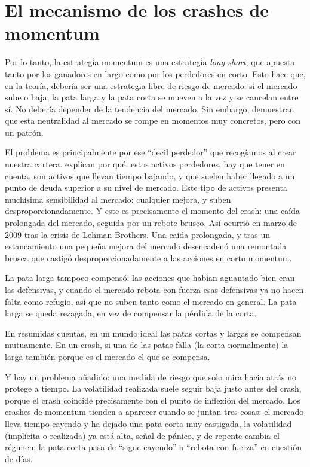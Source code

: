 \documentclass[12pt]{report} %
\begin{document}
\section{El mecanismo de los crashes de momentum}

Por lo tanto, la estrategia momentum es una estrategia \textit{long-short}, que apuesta tanto por los ganadores en largo como por los perdedores en corto. Esto hace que, en la teoría, debería ser una estrategia libre de riesgo de mercado: si el mercado sube o baja, la pata larga y la pata corta se mueven a la vez y se cancelan entre sí. No debería depender de la tendencia del mercado. Sin embargo, \citet{danielmoskowitz2016} demuestran que esta neutralidad al mercado se rompe en momentos muy concretos, pero con un patrón.

El problema es principalmente por ese ``decil perdedor'' que recogíamos al crear nuestra cartera. \citet{danielmoskowitz2016} explican por qué: estos activos perdedores, hay que tener en cuenta, son activos que llevan tiempo bajando, y que suelen haber llegado a un punto de deuda superior a su nivel de mercado. Este tipo de activos presenta muchísima sensibilidad al mercado: cualquier mejora, y suben desproporcionadamente. Y este es precisamente el momento del crash: una caída prolongada del mercado, seguida por un rebote brusco. Así ocurrió en marzo de 2009 tras la crisis de Lehman Brothers. Una caída prolongada, y tras un estancamiento una pequeña mejora del mercado desencadenó una remontada brusca que castigó desproporcionadamente a las acciones en corto momentum.

La pata larga tampoco compensó: las acciones que habían aguantado bien eran las defensivas, y cuando el mercado rebota con fuerza esas defensivas ya no hacen falta como refugio, así que no suben tanto como el mercado en general. La pata larga se queda rezagada, en vez de compensar la pérdida de la corta.

En resumidas cuentas, en un mundo ideal las patas cortas y largas se compensan mutuamente. En un crash, si una de las patas falla (la corta normalmente) la larga también porque es el mercado el que se compensa.

Y hay un problema añadido: una medida de riesgo que solo mira hacia atrás no protege a tiempo. La volatilidad realizada suele seguir baja justo antes del crash, porque el crash coincide precisamente con el punto de inflexión del mercado. Los crashes de momentum tienden a aparecer cuando se juntan tres cosas: el mercado lleva tiempo cayendo y ha dejado una pata corta muy castigada, la volatilidad (implícita o realizada) ya está alta, señal de pánico, y de repente cambia el régimen: la pata corta pasa de ``sigue cayendo'' a ``rebota con fuerza'' en cuestión de días.
\end{document}

